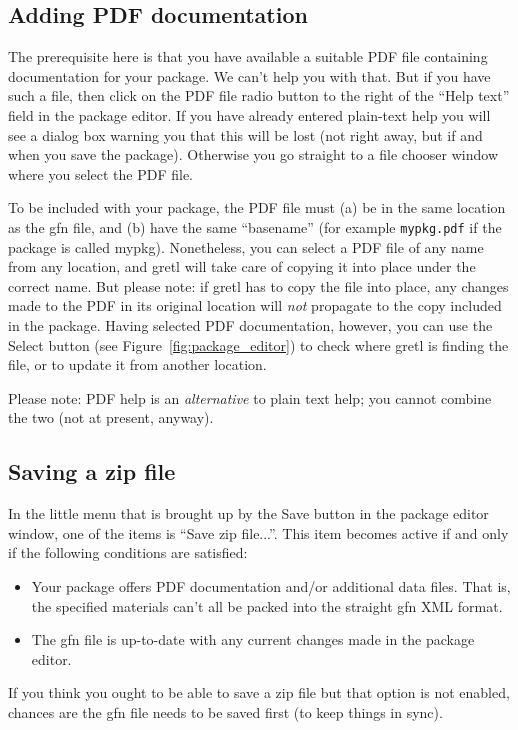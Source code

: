 \documentclass[oneside]{book}
\begin{document}
\subsection{Adding PDF documentation}
\label{sec:gui-pdf}

The prerequisite here is that you have available a suitable PDF file
containing documentation for your package. We can't help you with
that. But if you have such a file, then click on the \textsf{PDF file}
radio button to the right of the ``Help text'' field in the package
editor. If you have already entered plain-text help you will see a
dialog box warning you that this will be lost (not right away, but if
and when you save the package). Otherwise you go straight to a file
chooser window where you select the PDF file.

To be included with your package, the PDF file must (a) be in the same
location as the \textsf{gfn} file, and (b) have the same ``basename''
(for example \texttt{mypkg.pdf} if the package is called
\textsf{mypkg}). Nonetheless, you can select a PDF file of any name
from any location, and gretl will take care of copying it into place
under the correct name. But please note: if gretl has to copy the file
into place, any changes made to the PDF in its original location will
\textit{not} propagate to the copy included in the package. Having
selected PDF documentation, however, you can use the \textsf{Select}
button (see Figure~\ref{fig:package_editor}) to check where gretl is
finding the file, or to update it from another location.

Please note: PDF help is an \textit{alternative} to plain text
help; you cannot combine the two (not at present, anyway).

\subsection{Saving a zip file}
\label{sec:save-zip}

In the little menu that is brought up by the \textsf{Save} button in
the package editor window, one of the items is ``Save zip file...''.
This item becomes active if and only if the following conditions are
satisfied:
\begin{itemize}
\item Your package offers PDF documentation and/or additional data
  files. That is, the specified materials can't all be packed into the
  straight \textsf{gfn} XML format.
\item The \textsf{gfn} file is up-to-date with any current changes
  made in the package editor.
\end{itemize}
If you think you ought to be able to save a zip file but that option
is not enabled, chances are the \textsf{gfn} file needs to be saved
first (to keep things in sync).
\end{document}
